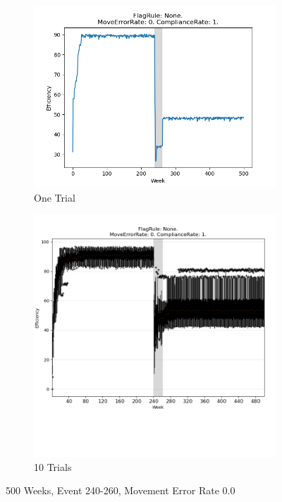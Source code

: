 \documentclass{article}%
\begin{document}
%


\begin{figure}[!htb]%
\begin{subfigure}[b]{0.45\linewidth}%
\includegraphics[width=\linewidth]{2000fr_None_er_0_cr_1_t1.png}%
\caption{One Trial}%
\end{subfigure}%
\begin{subfigure}[b]{0.45\linewidth}%
\includegraphics[clip,width=\linewidth,trim=0 4cm 0 0]{2000fr_None_er_0_cr_1_t10.png}%
\caption{10 Trials}%
\end{subfigure}%
\caption{500 Weeks, Event 240{-}260, Movement Error Rate 0.0}%
\end{figure}
\end{document}
